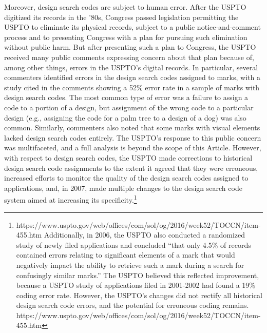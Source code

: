 \documentclass[letterpaper, 11pt, oneside]{article}
\begin{document}
Moreover, design search codes are subject to human error. After the USPTO digitized its records in the '80s, Congress passed legislation permitting the USPTO to eliminate its physical records, subject to a public notice-and-comment process and to presenting Congress with a plan for pursuing such elimination without public harm. But after presenting such a plan to Congress, the USPTO received many public comments expressing concern about that plan because of, among other things, errors in the USPTO's digital records. In particular, several commenters identified errors in the design search codes assigned to marks, with a study cited in the comments showing a 52\% error rate in a sample of marks with design search codes. The most common type of error was a failure to assign a code to a portion of a design, but assignment of the wrong code to a particular design (e.g., assigning the code for a palm tree to a design of a dog) was also common. Similarly, commenters also noted that some marks with visual elements lacked design search codes entirely. The USPTO's response to this public concern was multifaceted, and a full analysis is beyond the scope of this Article. However, with respect to design search codes, the USPTO made corrections to historical design search code assignments to the extent it agreed that they were erroneous, increased efforts to monitor the quality of the design search codes assigned to applications, and, in 2007, made multiple changes to the design search code system aimed at increasing its specificity.\footnote{https://www.uspto.gov/web/offices/com/sol/og/2016/week52/TOCCN/item-455.htm Additionally, in 2006, the USPTO also conducted a randomized study of newly filed applications and concluded ``that only 4.5\% of records contained errors relating to significant elements of a mark that would negatively impact the ability to retrieve such a mark during a search for confusingly similar marks.'' The USPTO believed this reflected improvement, because a USPTO study of applications filed in 2001-2002 had found a 19\% coding error rate. However, the USPTO's changes did not rectify all historical design search code errors, and the potential for erroneous coding remains. https://www.uspto.gov/web/offices/com/sol/og/2016/week52/TOCCN/item-455.htm}
\end{document}
